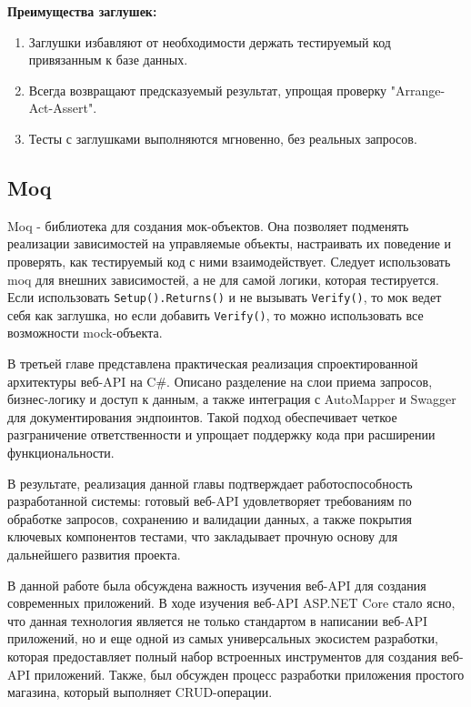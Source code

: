 \documentclass[a4paper,12pt]{report}
\begin{document}
\textbf{Преимущества заглушек:}
\begin{enumerate}
    \item
        Заглушки избавляют от необходимости держать тестируемый код привязанным к базе данных.
    \item
        Всегда возвращают предсказуемый результат, упрощая проверку "Arrange-Act-Assert".
    \item
        Тесты с заглушками выполняются мгновенно, без реальных запросов.
\end{enumerate}

\subsection{Moq}

Moq - библиотека для создания мок-объектов. Она позволяет подменять реализации зависимостей на управляемые объекты, 
настраивать их поведение и проверять, как тестируемый код с ними взаимодействует. Следует использовать moq для внешних зависимостей, 
а не для самой логики, которая тестируется. Если использовать \texttt{Setup().Returns()} и не вызывать \texttt{Verify()}, 
то мок ведет себя как заглушка, но если добавить \texttt{Verify()}, то можно использовать все возможности mock-объекта. 


В третьей главе представлена практическая реализация спроектированной архитектуры веб-\acs{API} на C\#. 
Описано разделение на слои приема запросов, бизнес-логику и доступ к данным, а также интеграция 
с AutoMapper и Swagger для документирования эндпоинтов. Такой подход обеспечивает четкое 
разграничение ответственности и упрощает поддержку кода при расширении функциональности.

В результате, реализация данной главы подтверждает работоспособность разработанной системы: 
готовый веб-\acs{API} удовлетворяет требованиям по обработке запросов, сохранению и валидации данных, 
а также покрытия ключевых компонентов тестами, что закладывает прочную основу для дальнейшего развития проекта.
    

В данной работе была обсуждена важность изучения веб-\acs{API} для создания современных приложений. 
В ходе изучения веб-\acs{API} ASP.NET Core стало ясно, что данная технология является не только стандартом 
в написании веб-\acs{API} приложений, но и еще одной из самых универсальных экосистем разработки, которая 
предоставляет полный набор встроенных инструментов для создания веб-\acs{API} приложений. Также, был обсужден 
процесс разработки приложения простого магазина, который выполняет \acs{CRUD}-операции.
\end{document}
